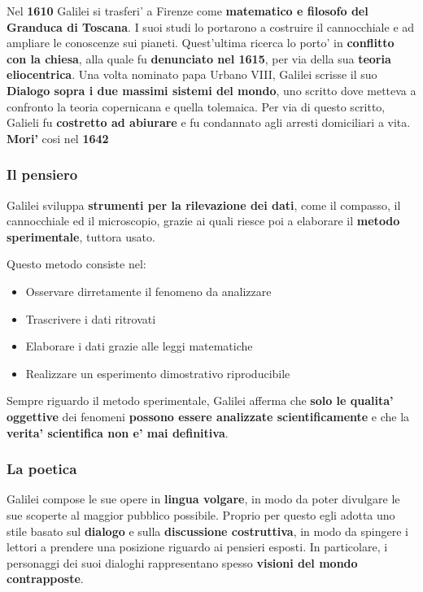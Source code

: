 \documentclass{article}
\begin{document}
{{    Nel \textbf{1610} Galilei si trasferi' a Firenze come \textbf{matematico e filosofo del Granduca di Toscana}. I suoi studi lo portarono a costruire il cannocchiale e ad ampliare le conoscenze sui pianeti. Quest'ultima ricerca lo porto' in \textbf{conflitto con la chiesa}, alla quale fu \textbf{denunciato nel 1615}, per via della sua \textbf{teoria eliocentrica}. Una volta nominato papa Urbano VIII, Galilei scrisse il suo \textbf{Dialogo sopra i due massimi sistemi del mondo}, uno scritto dove metteva a confronto la teoria copernicana e quella tolemaica. Per via di questo scritto, Galieli fu \textbf{costretto ad abiurare} e fu condannato agli arresti domiciliari a vita. \textbf{Mori'} cosi nel \textbf{1642}
    
    \subsubsection{Il pensiero} %
    Galilei sviluppa \textbf{strumenti per la rilevazione dei dati}, come il compasso, il cannocchiale ed il microscopio, grazie ai quali riesce poi a elaborare il \textbf{metodo sperimentale}, tuttora usato.

    Questo metodo consiste nel:
    
    \begin{itemize}
      \item Osservare dirretamente il fenomeno da analizzare
      \item Trascrivere i dati ritrovati
      \item Elaborare i dati grazie alle leggi matematiche
      \item Realizzare un esperimento dimostrativo riproducibile
    \end{itemize}

    Sempre riguardo il metodo sperimentale, Galilei afferma che \textbf{solo le qualita' oggettive} dei fenomeni \textbf{possono essere analizzate scientificamente} e che la \textbf{verita' scientifica non e' mai definitiva}.

    \subsubsection{La poetica} %
    Galilei compose le sue opere in \textbf{lingua volgare}, in modo da poter divulgare le sue scoperte al maggior pubblico possibile. Proprio per questo egli adotta uno stile basato sul \textbf{dialogo} e sulla \textbf{discussione costruttiva}, in modo da spingere i lettori a prendere una posizione riguardo ai pensieri esposti. In particolare, i personaggi dei suoi dialoghi rappresentano spesso \textbf{visioni del mondo contrapposte}.

}}
\end{document}
